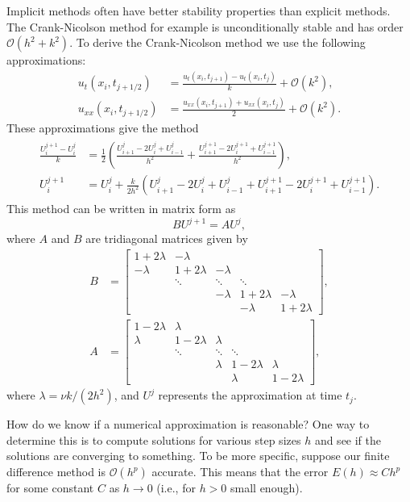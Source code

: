 Implicit methods often have better stability properties than explicit methods. The Crank-Nicolson method for example is unconditionally stable and has order $\mathcal{O}(h^2 + k^2)$. To derive the Crank-Nicolson method we use the following approximations: 
\begin{align*}
	u_t(x_i,t_{j+1/2}) &= \frac{u_t(x_i,t_{j+1}) - u_t(x_i,t_j)}{k} + \mathcal{O}(k^2), \\
	u_{xx}(x_i,t_{j+1/2}) &= \frac{u_{xx}(x_i,t_{j+1}) + u_{xx}(x_i,t_j)}{2} + \mathcal{O}(k^2).
\end{align*}
These approximations give the method 
\begin{align}
	\begin{split}
	\frac{U^{j+1}_i - U^j_i}{k} &= \frac{1}{2}\left( \frac{U^j_{i+1} - 2U^j_{i} + U^j_{i-1}}{h^2} + \frac{U^{j+1}_{i+1} - 2U^{j+1}_{i} + U^{j+1}_{i-1}}{h^2}  \right) ,\\
	U^{j+1}_i  &= U^j_i + \frac{k}{2h^2} \left( U^j_{i+1} - 2U^j_{i} + U^j_{i-1} + U^{j+1}_{i+1} - 2U^{j+1}_{i} + U^{j+1}_{i-1}   \right).
\end{split}
\end{align}
This method can be written in matrix form as 
\[
BU^{j+1} = A U^j ,
\]
where $A$ and $B$ are tridiagonal matrices given by 
\begin{align*}
B &= \left[\begin{array}{cccccc}1+2\lambda & -\lambda &  &  &  \\ -\lambda & 1+2\lambda &  -\lambda & &  \\ &  \ddots &   \ddots & \ddots \\ & &  -\lambda &  1+2\lambda & -\lambda \\ &  &  & -\lambda & 1+2\lambda\end{array}\right], \\
A &= \left[\begin{array}{cccccc}1-2\lambda & \lambda &  &  &  \\ \lambda & 1-2\lambda &  \lambda & &  \\ &  \ddots &   \ddots & \ddots \\ & &  \lambda &  1-2\lambda & \lambda \\ &  &  & \lambda & 1-2\lambda\end{array}\right], 
\end{align*}
where $\lambda = \nu k/(2h^2)$, 
and $U^j$ represents the approximation at time $t_j$.

How do we know if a numerical approximation is reasonable?  One way to determine this is to compute solutions for various step sizes $h$ and see if the solutions are converging to something.  To be more specific, suppose our finite difference method is $\mathcal{O}(h^p)$ accurate.  This means that the error $E(h) \approx Ch^p$ for some constant $C$ as $h \to 0$ (i.e., for $h>0$ small enough).


